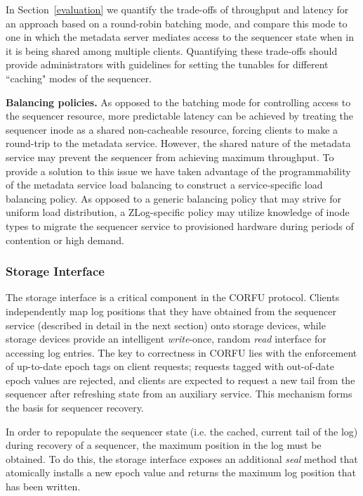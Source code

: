 \documentclass[preprint]{sigplanconf-eurosys}
\begin{document}
In Section~\ref{evaluation} we quantify the trade-offs of throughput and
latency for an approach based on a round-robin batching mode, and compare this
mode to one in which the metadata server mediates access to the sequencer state
when in it is being shared among multiple clients. Quantifying these trade-offs
should provide administrators with guidelines for setting the tunables for
different ``caching" modes of the sequencer.

{\bf Balancing policies.}
As opposed to the batching mode for controlling access to the sequencer
resource, more predictable latency can be achieved by treating the sequencer
inode as a shared non-cacheable resource, forcing clients to make a round-trip
to the metadata service. However, the shared nature of the metadata service
may prevent the sequencer from achieving maximum throughput. To provide a
solution to this issue we have taken advantage of the programmability of the
metadata service load balancing to construct a service-specific load balancing
policy. As opposed to a generic balancing policy that may strive for uniform
load distribution, a ZLog-specific policy may utilize knowledge of inode types
to migrate the sequencer service to provisioned hardware during periods of
contention or high demand.

\subsubsection{Storage Interface}

The storage interface is a critical component in the CORFU protocol. Clients
independently map log positions that they have obtained from the sequencer
service (described in detail in the next section) onto storage devices, while
storage devices provide an intelligent \emph{write}-once, random \emph{read}
interface for accessing log entries. The key to correctness in CORFU lies with
the enforcement of up-to-date epoch tags on client requests; requests tagged
with out-of-date epoch values are rejected, and clients are expected to
request a new tail from the sequencer after refreshing state from an auxiliary
service.  This mechanism forms the basis for sequencer recovery.

In order to repopulate the sequencer state (i.e. the cached, current tail of
the log) during recovery of a sequencer, the maximum position in the log must
be obtained. To do this, the storage interface exposes an additional
\emph{seal} method that atomically installs a new epoch value and returns the
maximum log position that has been written.
\end{document}
